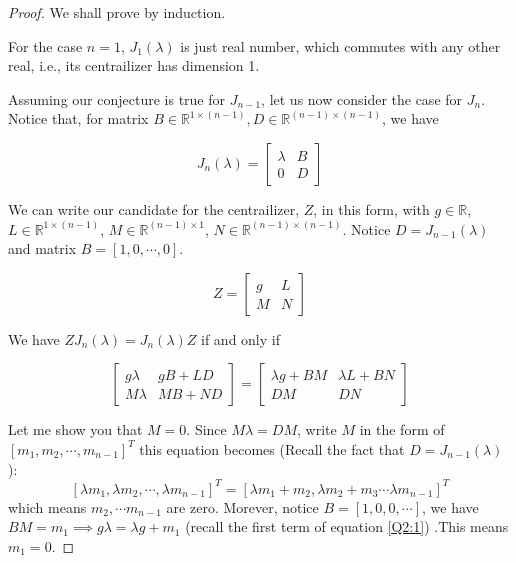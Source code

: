 \documentclass[12pt, a4paper]{article}
\theoremstyle{definition}
\theoremstyle{remark}
\newcommand{\bb}[1]{\mathbb{#1}}
\begin{document}
\begin{proof}
	We shall prove by induction.

	For the case $n=1$, $J_1(\lambda)$ is just real number, which commutes with any other real, i.e., its centrailizer has dimension 1.

	Assuming our conjecture is true for $J_{n-1}$, let us now consider the case for $J_n$.
	Notice that, for matrix $B \in \bb{R}^{1\times(n-1)}, D \in \bb{R}^{(n-1)\times(n-1)}$, we have

	$$
		J_n(\lambda)=
		\left[
			\begin{array}{c|c}
				\lambda & B \\
				\hline
				0       & D
			\end{array}
			\right]
	$$

	We can write our candidate for the centrailizer, $Z$, in this form, with $g \in \bb{R}$, $L \in \bb{R}^{1\times(n-1)}$, $M \in \bb{R}^{(n-1)\times1}$, $N \in \bb{R}^{(n-1)\times(n-1)}$.
	Notice $D = J_{n-1}(\lambda)$ and matrix $B = [1, 0, \cdots, 0]$.

	$$
		Z=
		\left[
			\begin{array}{c|c}
				g & L \\
				\hline
				M & N
			\end{array}
			\right]
	$$

	We have $ZJ_n(\lambda)=J_n(\lambda)Z$ if and only if

	\begin{equation}\label{Q2:1}
		\left[
			\begin{array}{c|c}
				g \lambda & gB+LD \\
				\hline
				M \lambda & MB+ND
			\end{array}
			\right]
		=
		\left[
			\begin{array}{c|c}
				\lambda g  + BM & \lambda L + BN \\
				\hline
				DM              & DN
			\end{array}
			\right]
	\end{equation}

	Let me show you that $M=0$.
	Since $M \lambda = DM$, write $M$ in the form of $[m_1, m_2, \cdots, m_{n-1}]^T$ this equation becomes
	(Recall the fact that $D = J_{n-1}(\lambda)$):
	$$[\lambda m_1, \lambda m_2, \cdots, \lambda m_{n-1}]^T = [\lambda m_1 + m_2, \lambda m_2 + m_3 \cdots \lambda m_{n-1}]^T$$
	which means $m_2, \cdots m_{n-1}$ are zero.
	Morever, notice $B = [1, 0, 0, \cdots ]$, we have $BM = m_1 \implies g\lambda  = \lambda g + m_1 $ (recall the first term of equation \ref{Q2:1}) .This means $ m_1 = 0$.


\end{proof}
\end{document}
